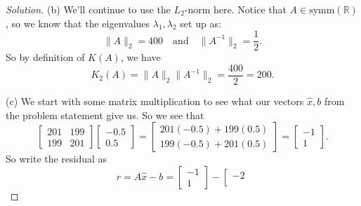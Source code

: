 \documentclass[12pt]{amsart}
\newenvironment{solution}
{\begin{proof}[Solution]}
{\end{proof}}
\begin{document}
\begin{onehalfspace}
\begin{solution}
            (b) We'll continue to use the $L_2$-norm here. Notice that $A\in\text{symm}(\mathbb{R})$, so we know that
            the eigenvalues $\lambda_1,\lambda_2$ set up as:
            \begin{displaymath}
                \|A\|_2 = 400 \quad\text{and}\quad \|A^{-1}\|_2 = \frac{1}{2}.
            \end{displaymath}
            So by definition of $K(A)$, we have
            \begin{displaymath}
                K_2(A) = \|A\|_2\|A^{-1}\|_2 = \frac{400}{2} = 200.
            \end{displaymath}

            (c) We start with some matrix multiplication to see what our vectors $\hat{x},b$ from the problem statement
            give us. So we see that
            \begin{displaymath}
                \left[\begin{matrix}
                          201 & 199\\
                          199 & 201
                \end{matrix}\right]
                \left[\begin{matrix}
                          -0.5\\
                          0.5
                \end{matrix}\right]
                =
                \left[\begin{matrix}
                          201(-0.5) + 199(0.5)\\
                          199(-0.5) + 201(0.5)
                \end{matrix}\right]
                =
                \left[\begin{matrix}
                          -1\\
                          1
                \end{matrix}\right].
            \end{displaymath}
            So write the residual as
            \begin{displaymath}
                r = A\hat{x} - b =
                \left[\begin{matrix}
                          -1\\
                          1
                \end{matrix}\right] -
                \left[\begin{matrix}
                          -2\\

\end{matrix}
\end{displaymath}
\end{solution}
\end{onehalfspace}
\end{document}
